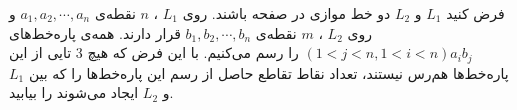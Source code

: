 \EXERCISE
فرض کنید
$L_1$
و
$L_2$
دو خط موازی در صفحه باشند. روی
$L_1$
،
$n$
نقطه‌ی
$a_1, a_2, \cdots, a_n$
و روی
$L_2$
،
$m$
نقطه‌ی
$b_1, b_2, \cdots, b_n$
قرار دارند. همه‌ی پاره‌خط‌های
$(1 < j < n, 1 < i < n) a_ib_j$
را رسم می‌کنیم. با این فرض که هیچ
$3$
تایی از این پاره‌خط‌ها هم‌رس نیستند، تعداد نقاط تقاطع حاصل از رسم این پاره‌خط‌ها را که بین
$L_1$
و
$L_2$
ایجاد می‌شوند را بیابید.